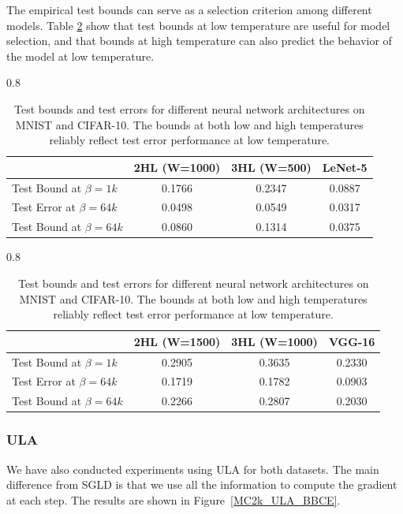 \documentclass{article} %
\begin{document}
The empirical test bounds can serve as a selection criterion among different models. Table \ref{tab:combined_results} show that test bounds at low temperature are useful for model selection, and that bounds at high temperature can also predict the behavior of the model at low temperature.


\begin{table}[htbp]
\centering

\begin{subtable}[t]{0.8\textwidth}
\centering
\begin{tabular}{lccc}
\toprule
 & 2HL (W=1000) & 3HL (W=500) & LeNet-5 \\
\midrule
Test Bound at $\beta = 1k$ & 0.1766 & 0.2347 & 0.0887 \\
Test Error at $\beta = 64k$ & 0.0498 & 0.0549 & 0.0317 \\
Test Bound at $\beta = 64k$ & 0.0860 & 0.1314 & 0.0375 \\
\bottomrule
\end{tabular}
\caption{MNIST, 8k training examples (true labels).}
\label{tab:mnist_results}
\end{subtable}

\vspace{0.5em}

\begin{subtable}[t]{0.8\textwidth}
\centering
\begin{tabular}{lccc}
\toprule
 & 2HL (W=1500) & 3HL (W=1000) & VGG-16 \\
\midrule
Test Bound at $\beta = 1k$ & 0.2905 & 0.3635 & 0.2330 \\
Test Error at $\beta = 64k$ & 0.1719 & 0.1782 & 0.0903 \\
Test Bound at $\beta = 64k$ & 0.2266 & 0.2807 & 0.2030 \\
\bottomrule
\end{tabular}
\caption{CIFAR-10, 8k training examples (true labels).}
\label{tab:cifar_results}
\end{subtable}

\caption{Test bounds and test errors for different neural network architectures on MNIST and CIFAR-10. The bounds at both low and high temperatures reliably reflect test error performance at low temperature.}
\label{tab:combined_results}
\end{table}
\FloatBarrier

\subsubsection{ULA} \label{sec:ULA}
We have also conducted experiments using ULA for both datasets. The main difference from SGLD is that we use all the information to compute the gradient at each step. The results are shown in Figure~\ref{MC2k_ULA_BBCE}. 
\end{document}
